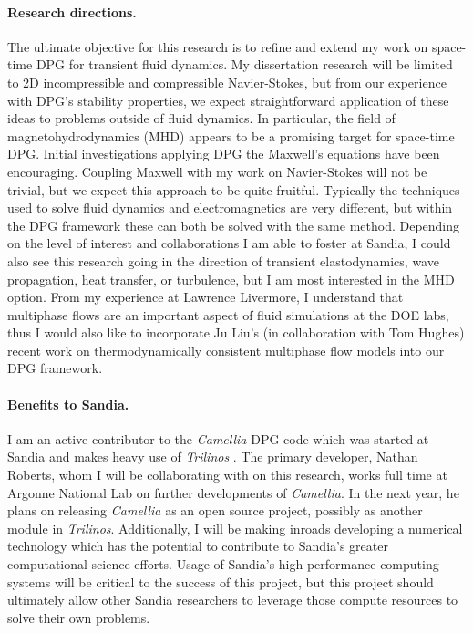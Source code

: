 \documentclass[letterpaper,12pt]{article}
\begin{document}
\paragraph{Research directions.}
The ultimate objective for this research is to refine and extend my work on space-time DPG for transient fluid dynamics.
My dissertation research will be limited to 2D incompressible and compressible Navier-Stokes, 
but from our experience with DPG's stability properties, we expect straightforward application of these ideas to problems outside of fluid dynamics.
In particular, the field of magnetohydrodynamics (MHD) appears to be a promising target for space-time DPG.
Initial investigations applying DPG the Maxwell's equations have been encouraging.
Coupling Maxwell with my work on Navier-Stokes will not be trivial, but we expect this approach to be quite fruitful.
Typically the techniques used to solve fluid dynamics and electromagnetics are very different, but within the DPG framework these can both be solved
with the same method.
Depending on the level of interest and collaborations I am able to foster at Sandia, 
I could also see this research going in the direction of transient elastodynamics, wave propagation, heat transfer, or turbulence,
but I am most interested in the MHD option.
From my experience at Lawrence Livermore, I understand that multiphase flows are an important aspect of fluid 
simulations at the DOE labs, thus
I would also like to incorporate Ju Liu's (in collaboration with Tom Hughes) recent work on thermodynamically consistent multiphase flow models
into our DPG framework.


\paragraph{Benefits to Sandia.}
I am an active contributor to the \emph{Camellia} \cite{CamelliaDPG} DPG code which was started at Sandia and makes heavy use of \emph{Trilinos} \cite{Trilinos}.
The primary developer, Nathan Roberts, whom I will be collaborating with on this research, works full time at Argonne National Lab on further developments of 
\emph{Camellia}. In the next year, he plans on releasing \emph{Camellia} as an open source project, possibly as another module in \emph{Trilinos}.
Additionally, I will be making inroads developing a numerical technology which has the potential to 
contribute to Sandia's greater computational science efforts.
Usage of Sandia's high performance computing systems will be critical to the success of this project, but this project should ultimately
allow other Sandia researchers to leverage those compute resources to solve their own problems.
\end{document}
